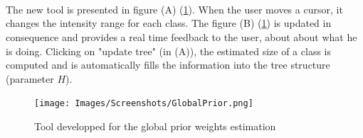 \\\\\\
\par
The new tool is presented in figure (A) (\ref{fig:globalpriors}). When the user moves a cursor, it changes the intensity range for each class. The figure (B) (\ref{fig:globalpriors}) is updated in consequence and provides a real time feedback to the user, about about what he is doing. Clicking on "update tree" (in (A)), the estimated size of a class is computed and is automatically fills the information into the tree structure (parameter $H$).
\begin{figure}\centering
  \texttt{[image: Images/Screenshots/GlobalPrior.png]}
  \caption{Tool developped for the global prior weights estimation}\label{fig:globalpriors}
\end{figure}

%

